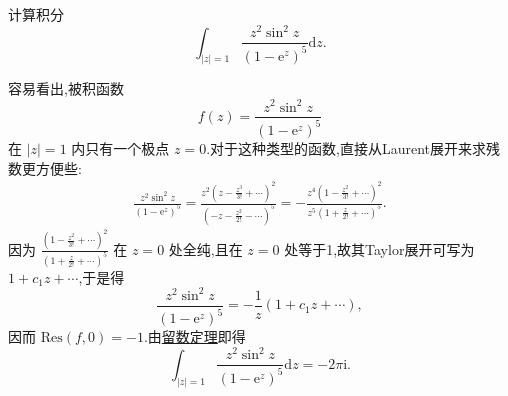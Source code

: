 \documentclass[../../main.tex]{subfiles}%
\begin{document}
\begin{example}
计算积分
\[
\int_{|z| = 1} \frac{z^2 \sin^2 z}{(1 - \mathrm{e}^z)^5} \mathrm{d}z.
\]
\end{example}
\begin{solution}

容易看出,被积函数
\[
f(z) = \frac{z^2 \sin^2 z}{(1 - \mathrm{e}^z)^5}
\]
在 \( |z| = 1 \) 内只有一个极点 \( z = 0 \).对于这种类型的函数,直接从Laurent展开来求残数更方便些:
\begin{align*}
\frac{z^2 \sin^2 z}{(1 - \mathrm{e}^z)^5} = \frac{z^2 \left( z - \frac{z^3}{3!} + \cdots \right)^2}{\left( -z - \frac{z^2}{2!} - \cdots \right)^5} = -\frac{z^4 \left( 1 - \frac{z^2}{3!} + \cdots \right)^2}{z^5 \left( 1 + \frac{z}{2!} + \cdots \right)^5}.
\end{align*}
因为 \( \frac{\left( 1 - \frac{z^2}{3!} + \cdots \right)^2}{\left( 1 + \frac{z}{2!} + \cdots \right)^5} \) 在 \( z = 0 \) 处全纯,且在 \( z = 0 \) 处等于1,故其Taylor展开可写为 \( 1 + c_1 z + \cdots \),于是得
\[
\frac{z^2 \sin^2 z}{(1 - \mathrm{e}^z)^5} = -\frac{1}{z} (1 + c_1 z + \cdots),
\]
因而 \( \mathrm{Res}(f, 0) = -1 \).由\hyperref[theorem:留数定理(残数定理)-定理5.4.9]{留数定理}即得
\[
\int_{|z| = 1} \frac{z^2 \sin^2 z}{(1 - \mathrm{e}^z)^5} \mathrm{d}z = -2\pi \mathrm{i}.
\]

\end{solution}
\end{document}
